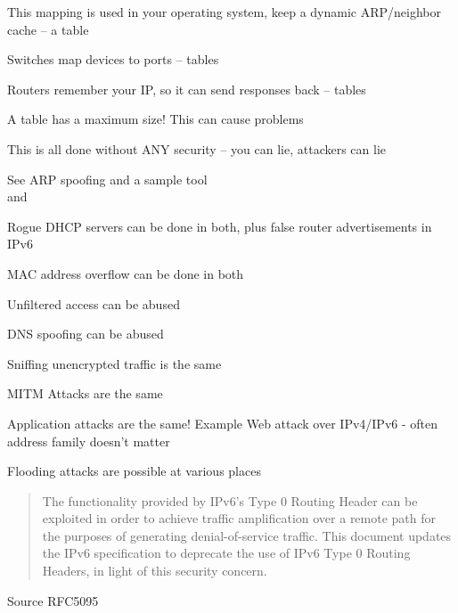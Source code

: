 \documentclass[Screen16to9,17pt]{foils}
\begin{document}
\begin{list2}
\item This mapping is used in your operating system, keep a dynamic ARP/neighbor cache -- a table
\item Switches map devices to ports -- tables
\item Routers remember your IP, so it can send responses back -- tables
\item A table has a maximum size! This can cause problems {\myalert}
\item This is all done without ANY security -- you can lie, attackers can lie
\item See ARP spoofing and a sample tool  \\
and 
\end{list2}



\begin{list2}
\item Rogue DHCP servers can be done in both, plus false router advertisements in IPv6
\item MAC address overflow can be done in both
\item Unfiltered access can be abused
\item DNS spoofing can be abused
\item Sniffing unencrypted traffic is the same
\item MITM Attacks are the same {\myalert}
\item Application attacks are the same! Example Web attack over IPv4/IPv6 - often address family doesn't matter {\myalert}
\item Flooding attacks are possible at various places
\end{list2}



\begin{quote}
The functionality provided by IPv6's Type 0 Routing Header can be exploited in order to achieve traffic amplification over a remote path for the purposes of generating denial-of-service traffic.  This document updates the IPv6 specification to deprecate the use of IPv6 Type 0 Routing Headers, in light of this security concern.
\end{quote}
Source RFC5095
\end{document}
